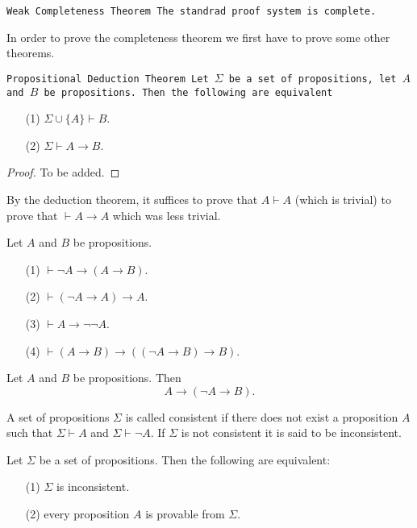 \documentclass[11pt,a4paper]{article}
\renewcommand{\implies}{\rightarrow}
\begin{document}
  \begin{theorem}\label{thm:weak-completeness}\tt{Weak Completeness Theorem}
    The standrad proof system is complete.
  \end{theorem}
  
  In order to prove the completeness theorem we first have to prove
  some other theorems.

  \begin{theorem}\tt{Propositional Deduction Theorem}
    Let $\Sigma$ be a set of propositions, let $A$ and $B$ be propositions.
    Then the following are equivalent
    \begin{itemize}
      \item[(1)] $\Sigma \cup \{A\} \vdash B$.
      \item[(2)] $\Sigma \vdash A \implies B$.
    \end{itemize}
  \end{theorem}
  \begin{proof}
    To be added.
  \end{proof}
  
  \begin{remark}
    By the deduction theorem, it suffices to prove that $A \vdash A$
    (which is trivial) to prove that $\vdash A \to A$ which was less
    trivial.
  \end{remark}

  \begin{proposition}
    Let $A$ and $B$ be propositions.
    \begin{enumerate}
      \item[(1)] $\vdash \neg A \implies (A \implies B)$.
      \item[(2)] $\vdash (\neg A \implies A) \implies A$.
      \item[(3)] $\vdash A \implies \neg \neg A$.
      \item[(4)] $\vdash (A \implies B) \implies 
        ((\neg A \implies B) \implies B)$.
    \end{enumerate}
  \end{proposition}

  \begin{proposition}
    Let $A$ and $B$ be propositions. Then
    \[ A \implies (\neg A \implies B). \]
  \end{proposition}

  \begin{definition}[Consistency]
    A set of propositions $\Sigma$ is called consistent if there does
    not exist a proposition $A$ such that $\Sigma \vdash A$ and 
    $\Sigma \vdash \neg A$. If $\Sigma$ is not consistent it is said
    to be inconsistent.
  \end{definition}
  \begin{proposition}
    Let $\Sigma$ be a set of propositions. Then the following are equivalent:
    \begin{enumerate}
      \item[(1)] $\Sigma$ is inconsistent.
      \item[(2)] every proposition $A$ is provable from $\Sigma$.
    \end{enumerate}
  \end{proposition}
\end{document}
